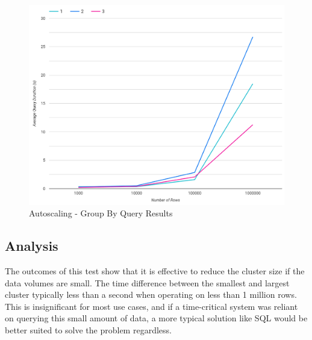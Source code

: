 \begin{figure}[ht]
	\centering
	\includegraphics[width=0.8\linewidth]{chapters/diagrams/testing/group-by-simple-autoscale-test}
	\caption{Autoscaling - Group By Query Results}
	\label{fig:group-by-simple-autoscale-test}
\end{figure}

\subsection{Analysis}
The outcomes of this test show that it is effective to reduce the cluster size if the data volumes are small. The time difference between the smallest and largest cluster typically less than a second when operating on less than 1 million rows. This is insignificant for most use cases, and if a time-critical system was reliant on querying this small amount of data, a more typical solution like SQL would be better suited to solve the problem regardless.
